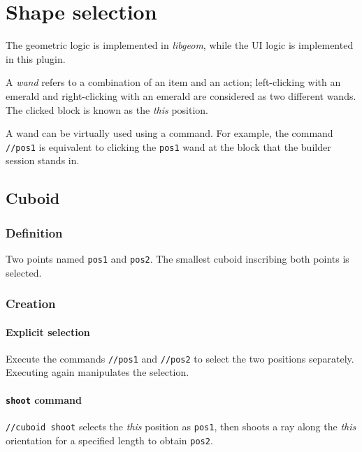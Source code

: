 \documentclass{report}
\begin{document}
		\chapter{Shape selection}
			The geometric logic is implemented in \textit{libgeom}, while the UI logic is implemented in this plugin.

			A \emph{wand} refers to a combination of an item and an action; left-clicking with an emerald and
			right-clicking with an emerald are considered as two different wands. The clicked block is known as the
			\textit{this} position.

			A wand can be virtually used using a command. For example, the command \texttt{//pos1} is equivalent to
			clicking the \texttt{pos1} wand at the block that the builder session stands in.

			\section{Cuboid}
				\subsection{Definition} Two points named \texttt{pos1} and \texttt{pos2}. The smallest cuboid
				inscribing both points is selected.
				\subsection{Creation}
					\subsubsection{Explicit selection} Execute the commands \texttt{//pos1} and \texttt{//pos2} to
					select the two positions separately. Executing again manipulates the selection.
					\subsubsection{\texttt{shoot} command} \texttt{//cuboid shoot} selects the \textit{this} position
					as \texttt{pos1}, then shoots a ray along the \textit{this} orientation for a specified length to
					obtain \texttt{pos2}.
\end{document}
